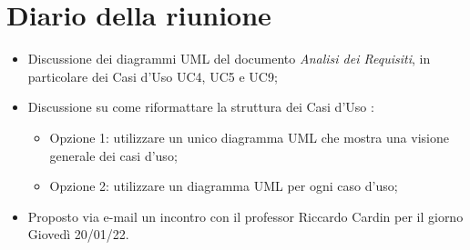 \section{Diario della riunione}
\begin{itemize}
  \item Discussione dei diagrammi UML del documento \textit{Analisi dei Requisiti}, in particolare dei Casi d'Uso UC4, UC5 e UC9;
  \item Discussione su come riformattare la struttura dei Casi d'Uso :
  \begin{itemize}
    \item Opzione 1: utilizzare un unico diagramma UML che mostra una visione generale dei casi d'uso;
    \item Opzione 2: utilizzare un diagramma UML per ogni caso d'uso;
  \end{itemize}
  \item Proposto via e-mail un incontro con il professor Riccardo Cardin per il giorno Giovedì 20/01/22.

\end{itemize}
